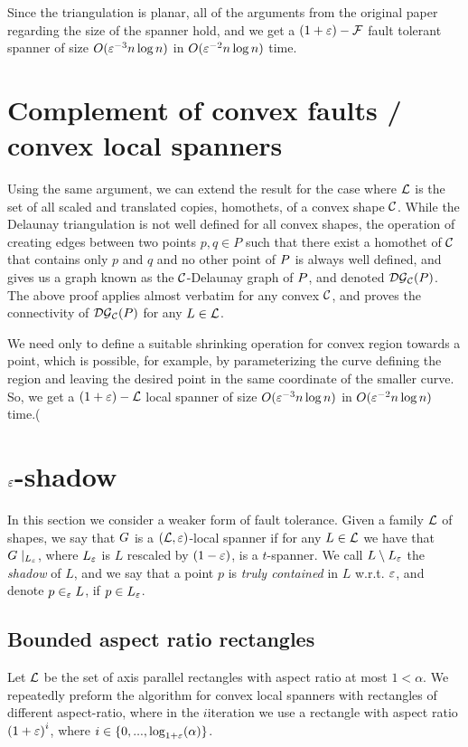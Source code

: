 \documentclass[12pt]{article}%
\begin{document}
Since the triangulation is planar, all of the arguments from the
original paper regarding the size of the spanner hold, and we get a
$(1+\varepsilon)-\mathcal{F}$ fault tolerant spanner of size $O(\varepsilon^{-3}n\log n)$ in
$O(\varepsilon^{-2}n\log n)$ time.

\section{Complement of convex faults / convex local spanners}
Using the same argument, we can extend the result for the case where
$\mathcal{L}$ is the set of all scaled and translated copies, homothets, of a
convex shape $\mathcal{C}$. While the Delaunay triangulation is not well
defined for all convex shapes, the operation of creating edges between
two points $p,q\in P$ such that there exist a homothet of $\mathcal{C}$ that
contains only $p$ and $q$ and no other point of $P$ is always well
defined, and gives us a graph known as the $\mathcal{C}$-Delaunay graph of
$P$, and denoted $\mathcal{DG}_{\mathcal{C}}(P)$. The above proof applies almost
verbatim for any convex $\mathcal{C}$, and proves the connectivity of
$\mathcal{DG}_{\mathcal{C}}(P)$ for any $L\in \mathcal{L}$.

We need only to define a suitable shrinking operation for convex
region towards a point, which is possible, for example, by
parameterizing the curve defining the region and leaving the desired
point in the same coordinate of the smaller curve. So, we get a
$(1+\varepsilon)-\mathcal{L}$ local spanner of size $O(\varepsilon^{-3}n\log n)$ in
$O(\varepsilon^{-2}n\log n)$ time.(



\section{$\varepsilon$-shadow}

In this section we consider a weaker form of fault tolerance. Given a
family $\mathcal{L}$ of shapes, we say that $G$ is a $(\mathcal{L},\varepsilon)$-local
spanner if for any $L\in\mathcal{L}$ we have that $G\mid_{L_{\varepsilon}}$, where
$L_{\varepsilon}$ is $L$ rescaled by $(1-\varepsilon)$, is a $t$-spanner. We call
$L\setminus L_{\varepsilon}$ the \emph{shadow} of $L$, and we say that a
point $p$ is \emph{truly contained} in $L$ w.r.t. $\varepsilon$, and denote
$p\in_{\varepsilon} L$, if $p\in L_{\varepsilon}$.

\subsection{Bounded aspect ratio rectangles}
Let $\mathcal{L}$ be the set of axis parallel rectangles with aspect ratio at
most $1<\alpha$. We repeatedly preform the algorithm for convex local
spanners with rectangles of different aspect-ratio, where in the
$i$\th iteration we use a rectangle with aspect ratio
$\left(1+\varepsilon\right)^i$, where $i\in\{0,...,\log_{1+\varepsilon}(\alpha)\}$.
\end{document}
